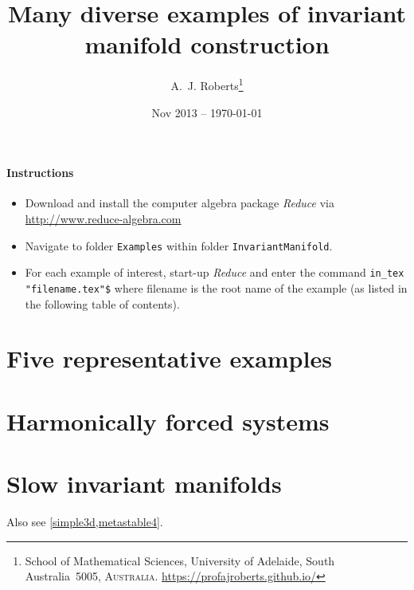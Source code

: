 \documentclass[11pt,a4paper]{refart}
\title{Many diverse examples of invariant manifold construction}
\author{A.~J. Roberts\thanks{School of Mathematical Sciences, University of Adelaide, South Australia~5005, \textsc{Australia}.
\url{https://profajroberts.github.io/}}}
\date{Nov 2013 -- \today}
\begin{document}
\maketitle


\paragraph{Instructions}
\begin{itemize}
\item Download and install the computer algebra package
\emph{Reduce} via \url{http://www.reduce-algebra.com}

\item Navigate to folder \verb|Examples| within folder \verb|InvariantManifold|.

\item For each example of interest, start-up \emph{Reduce} and enter the command \verb|in_tex "filename.tex"$|  where filename is the root name of the example (as listed in the following table of contents).

\end{itemize}


\tableofcontents




\section{Five representative examples}










\section{Harmonically forced systems}








\section{Slow invariant manifolds}

Also see \cref{simple3d,metastable4}.


\end{document}
